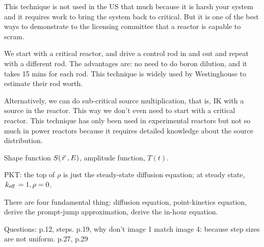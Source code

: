 \documentclass{school-22.211-notes}
\begin{document}
This technique is not used in the US that much because it is harsh your system and it requires work to bring the system back to critical. But it is one of the best ways to demonstrate to the licensing committee that a reactor is capable to scram.  

We start with a critical reactor, and drive a control rod in and out and repeat with a different rod. The advantages are: no need to do boron dilution, and it takes 15 mins for each rod. This technique is widely used by Westinghouse to estimate their rod worth. 




Alternatively, we can do sub-critical source multiplication, that is, IK with a source in the reactor. This way we don't even need to start with a critical reactor. This technique has only been used in experimental reactors but not so much in power reactors because it requires detailed knowledge about the source distribution. 



\clearpage
{}
Shape function $S(\left.\vec{r}\right., E)$, amplitude function, $T(t)$. 

PKT: the top of $\rho$ is just the steady-state diffusion equation; at steady state, $\left. k_{\mathrm{eff}} \right. = 1, \rho = 0$. 

There are four fundamental thing: diffusion equation, point-kinetics equation, derive the prompt-jump approximation, derive the in-hour equation. 


Questions:  p.12, steps. 
p.19, why don't image 1 match image 4: because step sizes are not uniform. 
p.27, 
p.29
\end{document}
